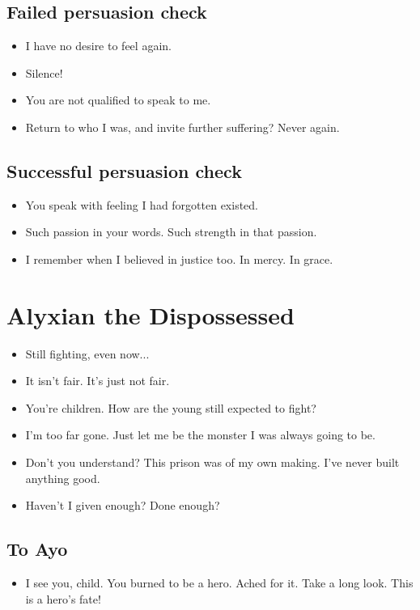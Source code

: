 \documentclass[10pt,a4paper,bg=print,twocolumn,openany,nodeprecatedcode]{dndarticle}
\begin{document}
\subsection*{Failed persuasion check}
\begin{itemize}
  \item I have no desire to feel again.
  \item Silence!
  \item You are not qualified to speak to me.
  \item Return to who I was, and invite further suffering? Never again.
\end{itemize}

\subsection*{Successful persuasion check}
\begin{itemize}
  \item You speak with feeling I had forgotten existed.
  \item Such passion in your words. Such strength in that passion.
  \item I remember when I believed in justice too. In mercy. In grace.
\end{itemize}

\section*{Alyxian the Dispossessed}

\begin{itemize}
  \item Still fighting, even now...
  \item It isn't fair. It's just not fair.
  \item You're children. How are the young still expected to fight?
  \item I'm too far gone. Just let me be the monster I was always going to be.
  \item Don't you understand? This prison was of my own making. I've never built anything good.
  \item Haven't I given enough? Done enough?
\end{itemize}

\subsection*{To Ayo}
\begin{itemize}
  \item I see you, child. You burned to be a hero. Ached for it. Take a long look. This is a hero's fate!
\end{itemize}
\end{document}
